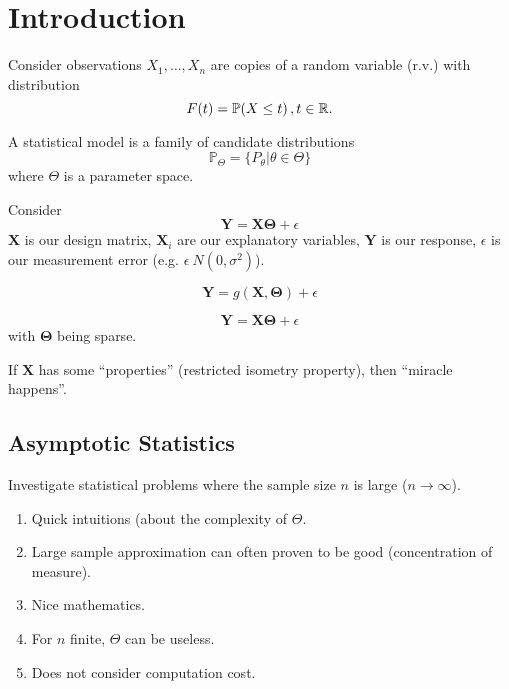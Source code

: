 \chapter{Introduction}
\label{cha:introduction}

Consider observations $X_{1}, \dots, X_{n}$ are copies of a random
variable (r.v.) with distribution $$F(t) = \Prob{X \leq t}, t \in
\mathbb{R}.$$

\begin{defn}
  A statistical model is a family of candidate distributions 
  $$\mathbb{P}_{\Theta} = \{ P_{\theta} | \theta \in \Theta \}$$ where
  $\Theta$ is a parameter space.
\end{defn}
\begin{exmp}
  Consider
  \begin{equation}
    \label{eq:1}
    \mathbf{Y} = \mathbf{X \Theta} + \epsilon
  \end{equation}
  $\mathbf{X}$ is our design matrix, $\mathbf{X}_{i}$ are our
  explanatory variables, $\mathbf{Y}$ is our response, $\epsilon$ is
  our measurement error (e.g. $\epsilon ~ N(0, \sigma^{2})$).
\end{exmp}


\begin{exmp}
  \begin{equation}
    \label{eq:2}
    \mathbf{Y} = g(\mathbf{X}, \mathbf{\Theta}) + \epsilon
  \end{equation}
\end{exmp}

\begin{exmp}
  \begin{equation}
    \label{eq:3}
    \mathbf{Y} = \mathbf{X \Theta} + \epsilon
  \end{equation}
  with $\mathbf{\Theta}$ being sparse.

  If $\mathbf{X}$ has some ``properties'' (restricted isometry property), then ``miracle happens''.
\end{exmp}

\section{Asymptotic Statistics}
\label{sec:asympt-stat}

Investigate statistical problems where the sample size $n$ is large
($n \rightarrow \infty$).
\begin{enumerate}
\item Quick intuitions (about the complexity of $\Theta$.
\item Large sample approximation can often proven to be good
  (concentration of measure).
\item Nice mathematics.
\item For $n$ finite, $\Theta$ can be useless.
\item Does not consider computation cost.
\end{enumerate}

